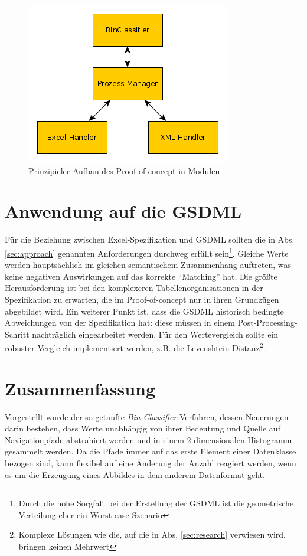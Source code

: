 \documentclass[a4paper,10pt]{article}
\begin{document}
\begin{figure}
 \centering
 \includegraphics[scale=0.3]{ProjektStruktur}
 \caption{Prinzipieler Aufbau des Proof-of-concept in Modulen}
 \label{project_structure}
\end{figure}

\section{Anwendung auf die GSDML}
Für die Beziehung zwischen Excel-Spezifikation und GSDML sollten die in Abs. \ref{sec:approach} genannten
Anforderungen durchweg erfüllt sein\footnote{Durch die hohe Sorgfalt bei der Erstellung der GSDML ist die geometrische
Verteilung eher ein Worst-case-Szenario}. Gleiche Werte werden hauptsächlich im gleichen semantischem Zusammenhang
auftreten, was keine negativen Auswirkungen auf das korrekte ``Matching'' hat. Die größte Herausforderung ist
bei den komplexeren Tabellenorganisationen in der Spezifikation zu erwarten, die im Proof-of-concept nur in
ihren Grundzügen abgebildet wird. Ein weiterer Punkt ist, dass die GSDML historisch bedingte Abweichungen von
der Spezifikation hat: diese müssen in einem Post-Processing-Schritt nachträglich eingearbeitet werden. Für den
Wertevergleich sollte ein robuster Vergleich implementiert werden, z.B. die Levenshtein-Distanz\footnote{Komplexe
Lösungen wie die, auf die in Abs. \ref{sec:research} verwiesen wird, bringen keinen Mehrwert}.

\section{Zusammenfassung}
Vorgestellt wurde der so getaufte \textit{Bin-Classifier}-Verfahren, dessen Neuerungen darin bestehen, dass Werte
unabhängig von ihrer Bedeutung und Quelle auf Navigationpfade abstrahiert werden und in einem
2-dimensionalen Histogramm gesammelt werden. Da die Pfade immer auf das erste Element einer Datenklasse bezogen sind,
kann flexibel auf eine Änderung der Anzahl reagiert werden, wenn es um die Erzeugung eines Abbildes in dem anderem
Datenformat geht.

\printbibliography
\end{document}
